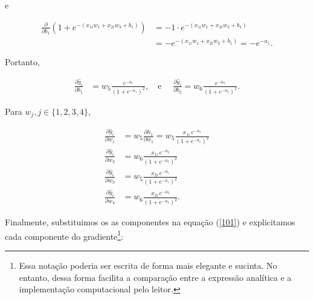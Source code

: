\documentclass[
  a4paperpaper,
]{article}
\begin{document}
e

\begin{align*}
\frac{\partial}{\partial b_1} \left(1+ e^{-(x_{1i} w_1 + x_{2i} w_3 + b_1)} \right) &= -1 \cdot e^{-(x_{1i} w_1 + x_{2i} w_3 + b_1)} \\
&= -e^{-(x_{1i} w_1 + x_{2i} w_3 + b_1)} = -e^{-a_1}.
\end{align*}

Portanto,

\begin{align*}
  \frac{\partial \hat{y}_i}{\partial b_1} &= w_5 \frac{e^{-a_1}}{\left( 1+e^{-a_1} \right)^2 }, \quad \text{e } \quad \frac{\partial \hat{y}_i}{\partial b_2} = w_6 \frac{e^{-a_2}}{\left( 1+e^{-a_2} \right)^2 }.
\end{align*}

Para \(w_j, j \in \{ 1, 2, 3, 4 \}\),

\begin{align*}
  \frac{\partial \hat{y}_i}{\partial w_1} &= w_5 \frac{\partial h_1}{\partial w_1} = w_5 \frac{x_{1i} \, e^{-a_1}}{\left(1 + e^{-a_1}\right)^2} \\
  \frac{\partial \hat{y}_i}{\partial w_2} &= w_6 \frac{x_{1i} \, e^{-a_2}}{\left(1 + e^{-a_2}\right)^2} \\
  \frac{\partial \hat{y}_i}{\partial w_3} &= w_5 \frac{x_{2i} \, e^{-a_1}}{\left(1 + e^{-a_1}\right)^2} \\
  \frac{\partial \hat{y}_i}{\partial w_4} &= w_6 \frac{x_{2i} \, e^{-a_2}}{\left(1 + e^{-a_2}\right)^2}.
\end{align*}

Finalmente, substituimos os as componentes na equação (\ref{101}) e
explicitamos cada componente do gradiente\footnote{Essa notação poderia
  ser escrita de forma mais elegante e sucinta. No entanto, dessa forma
  facilita a comparação entre a expressão analítica e a implementação
  computacional pelo leitor.}:
\end{document}
